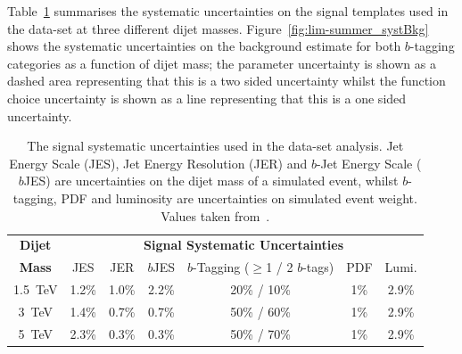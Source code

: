 Table~\ref{tab:lim-summer_syst} summarises the systematic uncertainties
on the signal templates used in the \summer{} data-set at
three different dijet masses. Figure~\ref{fig:lim-summer_systBkg} shows the systematic uncertainties on the background estimate
for both $b$-tagging categories as a function of dijet mass;
the parameter uncertainty is shown as a dashed area representing that this is a two sided uncertainty
whilst the function choice uncertainty is shown as a line representing that this is a one sided uncertainty.


\vspace{-0.5em}
\begin{table}[!htb]
  \centering
  \begin{tabular}{|c||c|c|c|c|c|c|}
    \hline
    \textbf{Dijet}   & \multicolumn{6}{c|}{\textbf{Signal Systematic Uncertainties}}                             \\ \cline{2-7} 
    \textbf{Mass}    & JES   & JER   & $b$JES  & $b$-Tagging ($\geq$1 / 2 $b$-tags) & PDF & Lumi.       \\
    \hline                                                                        
    1.5~TeV          & 1.2\% & 1.0\% & 2.2\%   &        20\% / 10\%                 & 1\% & 2.9\%       \\
    3~TeV            & 1.4\% & 0.7\% & 0.7\%   &        50\% / 60\%                 & 1\% & 2.9\%       \\
    5~TeV            & 2.3\% & 0.3\% & 0.3\%   &        50\% / 70\%                 & 1\% & 2.9\%       \\
    \hline
  \end{tabular}
\caption[The signal systematic uncertainties used in the \summer{} data-set analysis.]
        {The signal systematic uncertainties used in the \summer{} data-set analysis.
          Jet Energy Scale (JES), Jet Energy Resolution (JER) and $b$-Jet Energy Scale ($b$JES)
          are uncertainties on the dijet mass of a simulated event,
          whilst $b$-tagging, PDF and luminosity are uncertainties on simulated event weight.
          Values taken from~\cite{dibjet-ichep_conf}.}
  \label{tab:lim-summer_syst}
  \end{table}
